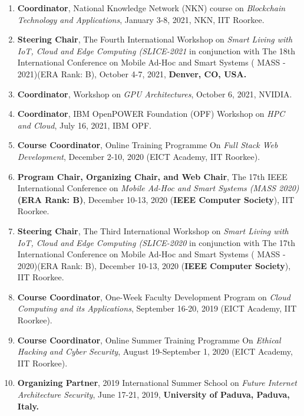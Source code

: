 \begin{enumerate} %
\item 
\textbf{Coordinator}, National Knowledge Network (NKN) course on \textit{Blockchain Technology and Applications}, January 3-8, 2021, NKN, IIT Roorkee.

\item 
\textbf{Steering Chair}, The Fourth International Workshop on \textit{Smart Living with IoT, Cloud and Edge Computing (SLICE-2021} in conjunction with The 18th International Conference on Mobile Ad-Hoc and Smart Systems ( MASS - 2021)(ERA Rank: B), October 4-7, 2021, \textbf{Denver, CO, USA.}

\item 
\textbf{Coordinator}, Workshop on \textit{GPU Architectures}, October 6, 2021, NVIDIA.

\item 
\textbf{Coordinator}, IBM OpenPOWER Foundation (OPF) Workshop on \textit{HPC and Cloud}, July 16, 2021,  IBM OPF.

\item 
\textbf{Course Coordinator}, Online Training Programme On \textit{Full Stack Web Development}, December 2-10, 2020 (EICT Academy, IIT Roorkee).

\item 
\textbf{Program Chair, Organizing Chair, and Web Chair}, The 17th IEEE International Conference on \textit{Mobile Ad-Hoc and Smart Systems (MASS 2020)} \textbf{(ERA Rank: B)}, December 10-13, 2020 (\textbf{IEEE Computer Society}), IIT Roorkee.

\item 
\textbf{Steering Chair}, The Third International Workshop on \textit{Smart Living with IoT, Cloud and Edge Computing (SLICE-2020} in conjunction with The 17th International Conference on Mobile Ad-Hoc and Smart Systems ( MASS - 2020)(ERA Rank: B), December 10-13, 2020 (\textbf{IEEE Computer Society}), IIT Roorkee.

\item 
\textbf{Course Coordinator}, One-Week Faculty Development Program on \textit{Cloud Computing and its Applications}, September 16-20, 2019 (EICT Academy, IIT Roorkee).

\item 
\textbf{Course Coordinator}, Online Summer Training Programme On \textit{Ethical Hacking and Cyber Security}, August 19-September 1, 2020 (EICT Academy, IIT Roorkee).

\item 
\textbf{Organizing Partner}, 2019 International Summer School on  \textit{Future Internet Architecture Security}, June 17-21, 2019, \textbf{University of Paduva, Paduva, Italy.}


\end{enumerate}

